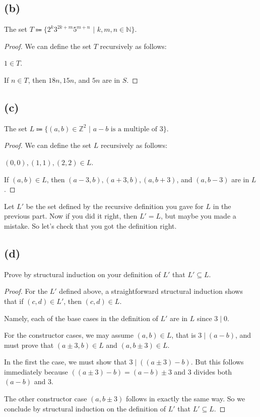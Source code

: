 \documentclass[14pt]{extarticle}
\begin{document}
\subsection{(b)}
The set $T \Coloneqq \{2^k 3^{2k+m} 5^{m+n} \,\,|\,\, k, m, n \in \mathbb{N} \}$.
\begin{proof}
We can define the set $T$ recursively as follows:

$1 \in T$.

If $n \in T$, then $18n, 15n$, and $5n$ are in $S$.
\end{proof}

\subsection{(c)}
The set $L \Coloneqq \{(a,b) \in \mathbb{Z}^2 \,\,|\,\, a-b \text{ is a multiple of 3}\}$.
\begin{proof}
We can define the set $L$ recursively as follows:

$(0,0), (1,1), (2,2) \in L$.

If $(a,b) \in L$, then $(a-3,b), (a+3,b), (a,b+3)$, and $(a,b-3)$ are in $L$.
\end{proof}

Let $L'$ be the set defined by the recursive definition you gave for $L$ in the previous part. Now if you did it right, then $L' = L$, but maybe you made a mistake. So let’s check that you got the definition right.

\subsection{(d)}
Prove by structural induction on your definition of $L'$ that $L' \subseteq L$.
\begin{proof}
For the $L'$ defined above, a straightforward structural induction shows that if $(c, d) \in L'$, then $(c, d) \in L$. 

Namely, each of the base cases in the definition of $L'$ are in $L$ since $3 \mid 0$. 

For the constructor cases, we may assume $(a, b) \in L$, that is $3 \mid (a - b)$, and must prove that $(a \pm 3, b) \in L$ and $(a, b \pm 3) \in L$. 

In the first the case, we must show that $3 \mid ((a \pm 3) - b)$. But this follows immediately because $((a \pm 3) - b) = (a - b) \pm 3$ and 3 divides both $(a - b)$ and 3. 

The other constructor case $(a, b \pm 3)$ follows in exactly the same way. So we conclude by structural induction on the definition of $L'$ that $L' \subseteq L$.
\end{proof}
\end{document}
